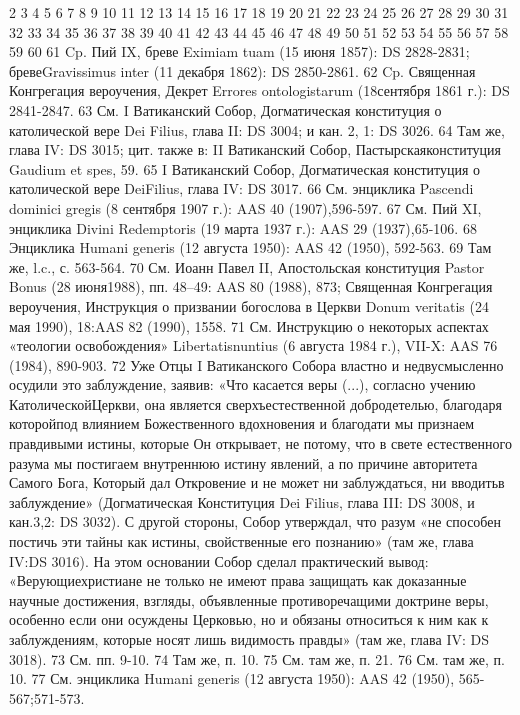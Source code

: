 \documentclass[a5paper,10pt]{article}
\begin{document}
2 
3 
4 
5 
6 
7 
8 
9 
10 
11 
12 
13 
14 
15 
16 
17 
18 
19 
20 
21 
22 
23 
24 
25 
26 
27 
28 
29 
30 
31 
32 
33 
34 
35 
36 
37 
38 
39 
40 
41 
42 
43 
44 
45 
46 
47 
48 
49 
50 
51 
52 
53 
54 
55 
56 
57 
58 
59 
60 
61 Cp. Пий IX, бреве Eximiam tuam (15 июня 1857): DS 2828-2831; бревеGravissimus inter (11 декабря 1862): DS 2850-2861.
62 Cp. Священная Конгрегация вероучения, Декрет Errores ontologistarum (18сентября 1861 г.): DS 2841-2847.
63 См. I Ватиканский Собор, Догматическая конституция о католической вере Dei Filius, глава II: DS 3004; и кан. 2, 1: DS 3026.
64 Там же, глава IV: DS 3015; цит. также в: II Ватиканский Собор, Пастырскаяконституция Gaudium et spes, 59.
65 I Ватиканский Собор, Догматическая конституция о католической вере DeiFilius, глава IV: DS 3017.
66 См. энциклика Pascendi dominici gregis (8 сентября 1907 г.): AAS 40 (1907),596-597.
67 См. Пий XI, энциклика Divini Redemptoris (19 марта 1937 г.): AAS 29 (1937),65-106.
68 Энциклика Humani generis (12 августа 1950): AAS 42 (1950), 592-563.
69 Там же, l.c., с. 563-564.
70 См. Иоанн Павел II, Апостольская конституция Pastor Bonus (28 июня1988), пп. 48–49: AAS 80 (1988), 873; Священная Конгрегация вероучения, Инструкция о призвании богослова в Церкви Donum veritatis (24 мая 1990), 18:AAS 82 (1990), 1558.
71 См. Инструкцию о некоторых аспектах «теологии освобождения» Libertatisnuntius (6 августа 1984 г.), VII-X: AAS 76 (1984), 890-903.
72 Уже Отцы I Ватиканского Собора властно и недвусмысленно осудили это заблуждение, заявив: «Что касается веры (...), согласно учению КатолическойЦеркви, она является сверхъестественной добродетелью, благодаря которойпод влиянием Божественного вдохновения и благодати мы признаем правдивыми истины, которые Он открывает, не потому, что в свете естественного разума мы постигаем внутреннюю истину явлений, а по причине авторитета Самого Бога, Который дал Откровение и не может ни заблуждаться, ни вводитьв заблуждение» (Догматическая Конституция Dei Filius, глава III: DS 3008, и кан.3,2: DS 3032). С другой стороны, Собор утверждал, что разум «не способен постичь эти тайны как истины, свойственные его познанию» (там же, глава IV:DS 3016). На этом основании Собор сделал практический вывод: «Верующиехристиане не только не имеют права защищать как доказанные научные достижения,
взгляды, объявленные противоречащими доктрине веры, особенно если они осуждены Церковью, но и обязаны относиться к ним как к заблуждениям, которые носят лишь видимость правды» (там же, глава IV: DS 3018).
73 См. пп. 9-10.
74 Там же, п. 10.
75 См. там же, п. 21.
76 См. там же, п. 10.
77 См. энциклика Humani generis (12 августа 1950): AAS 42 (1950), 565-567;571-573.
\end{document}
